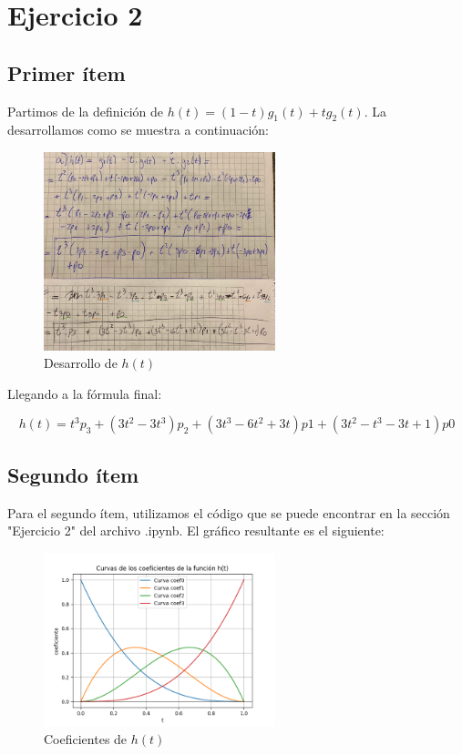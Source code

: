 \documentclass{article}
\begin{document}
\section*{Ejercicio 2}
\subsection*{Primer ítem}
Partimos de la definición de $h(t) = (1 - t)g_1(t) + t g_2(t)$. La desarrollamos como se muestra a continuación:

\begin{figure}[H]
    \centering
    \includegraphics[width=0.6\textwidth]{imagenes/2a.png}
    \caption{Desarrollo de $h(t)$}
    \label{fig:ejemplo}
\end{figure}

Llegando a la fórmula final:

$$
h(t) = t^3p_3 + (3t^2-3t^3)p_2 + (3t^3-6t^2+3t)p1 + (3t^2-t^3-3t+1)p0
$$

\subsection*{Segundo ítem}
Para el segundo ítem, utilizamos el código que se puede encontrar en la sección "Ejercicio 2" del archivo .ipynb. El gráfico resultante es el siguiente:

\begin{figure}[H]
    \centering
    \includegraphics[width=0.6\textwidth]{imagenes/graf_2a.png}
    \caption{Coeficientes de $h(t)$}
    \label{fig:ejemplo}
\end{figure}
\end{document}
